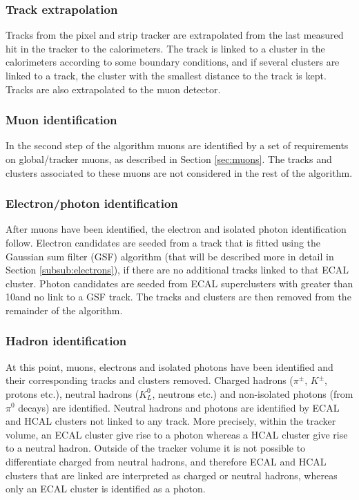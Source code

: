 \subsubsection*{Track extrapolation}
\noindent\justify
Tracks from the pixel and strip tracker are extrapolated from the last measured hit in the tracker to the calorimeters. 
The track is linked to a cluster in the calorimeters according to some boundary conditions, and if several clusters are linked to a track, the cluster with the smallest distance to the track is kept. 
Tracks are also extrapolated to the muon detector. 
\subsubsection*{Muon identification} 
\noindent\justify
In the second step of the algorithm muons are identified by a set of requirements on global/tracker muons, as described in Section \ref{sec:muons}.
The tracks and clusters associated to these muons are not considered in the rest of the algorithm. 
\subsubsection*{Electron/photon identification} 
\noindent\justify
After muons have been identified, the electron and isolated photon identification follow.
Electron candidates are seeded from a track that is fitted using the Gaussian sum filter (GSF) algorithm (that will be described more in detail in Section \ref{subsub:electrons}), if there are no additional tracks linked to that ECAL cluster. 
Photon candidates are seeded from ECAL superclusters with \ET greater than 10\GeV and no link to a GSF track.
The tracks and clusters are then removed from the remainder of the algorithm. 
\subsubsection*{Hadron identification}  
\noindent\justify
At this point, muons, electrons and isolated photons have been identified and their corresponding tracks and clusters removed.
Charged hadrons ($\pi^{\pm}$, $K^{\pm}$, protons etc.), neutral hadrons ($K_{L}^{0}$, neutrons etc.) and non-isolated photons (from $\pi^{0}$ decays) are identified. 
Neutral hadrons and photons are identified by ECAL and HCAL clusters not linked to any track. 
More precisely, within the tracker volume, an ECAL cluster give rise to a photon whereas a HCAL cluster give rise to a neutral hadron. 
Outside of the tracker volume it is not possible to differentiate charged from neutral hadrons, and therefore ECAL and HCAL clusters that are linked are interpreted as charged or neutral hadrons, whereas only an ECAL cluster is identified as a photon. 

